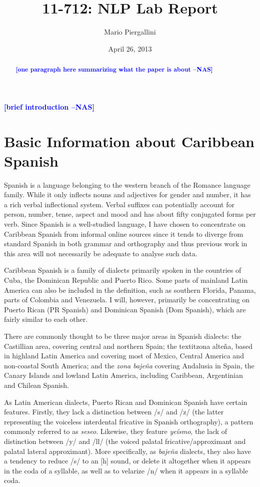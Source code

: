 \documentclass[11pt,letterpaper]{article}
\title{11-712:  NLP Lab Report}
\author{Mario Piergallini}
\date{April 26, 2013}
\newcommand{\nascomment}[1]{\textcolor{blue}{\textbf{[#1 --NAS]}}}
\begin{document}
\maketitle
\begin{abstract}
\nascomment{one paragraph here summarizing what the paper is about}
\end{abstract}

\nascomment{brief introduction}

\section{Basic Information about Caribbean Spanish}

Spanish is a language belonging to the western branch of the Romance language family. While it only inflects nouns and adjectives for gender and number, it has a rich verbal inflectional system. Verbal suffixes can potentially account for person, number, tense, aspect and mood and has about fifty conjugated forms per verb. Since Spanish is a well-studied language, I have chosen to concentrate on Caribbean Spanish from informal online sources since it tends to diverge from standard Spanish in both grammar and orthography and thus previous work in this area will not necessarily be adequate to analyse such data.

Caribbean Spanish is a family of dialects primarily spoken in the countries of Cuba, the Dominican Republic and Puerto Rico. Some parts of mainland Latin America can also be included in the definition, such as southern Florida, Panama, parts of Colombia and Venezuela. I will, however, primarily be concentrating on Puerto Rican (PR Spanish) and Dominican Spanish (Dom Spanish), which are fairly similar to each other.

There are commonly thought to be three major areas in Spanish dialects: the Castillian area, covering central and northern Spain; the textit{zona alteña}, based in highland Latin America and covering most of Mexico, Central America and non-coastal South America; and the \textit{zona bajeña} covering Andalusia in Spain, the Canary Islands and lowland Latin America, including Caribbean, Argentinian and Chilean Spanish.

As Latin American dialects, Puerto Rican and Dominican Spanish have certain features. Firstly, they lack a distinction between /s/ and /z/ (the latter representing the voiceless interdental fricative in Spanish orthography), a pattern commonly referred to as \textit{seseo}. Likewise, they feature \textit{yeísmo}, the lack of distinction between /y/ and /ll/ (the voiced palatal fricative/approximant and palatal lateral approximant). More specifically, as \textit{bajeña} dialects, they also have a tendency to reduce /s/ to an [h] sound, or delete it altogether when it appears in the coda of a syllable, as well as to velarize /n/ when it appears in a syllable coda.
\end{document}
